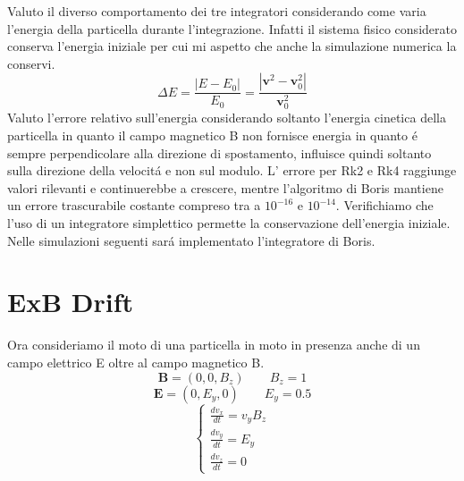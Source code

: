 Valuto il diverso comportamento dei tre integratori considerando come varia l'energia della particella durante l'integrazione. 
Infatti il sistema fisico considerato conserva l'energia iniziale per cui mi aspetto che anche la simulazione numerica la conservi. \\ 
$$\Delta E=\frac{|E-E_0|}{E_0} = \frac{|\mathbf{v}^2 - \mathbf{v}_0^2|}{\mathbf{v}_0^2}$$
Valuto l'errore relativo sull'energia considerando soltanto l'energia cinetica della particella in quanto il campo magnetico B non fornisce energia in quanto é sempre perpendicolare alla direzione di spostamento, influisce quindi soltanto sulla direzione della velocitá e non sul modulo.
L' errore per Rk2 e Rk4 raggiunge valori rilevanti e continuerebbe a crescere, mentre l'algoritmo di Boris mantiene un errore trascurabile costante compreso tra a $10^{-16}$ e $10^{-14}$. Verifichiamo  che l'uso di un integratore simplettico permette la conservazione dell'energia iniziale.
Nelle simulazioni seguenti sará implementato l'integratore di Boris.

\section{ExB Drift}
Ora consideriamo il moto di una particella in moto in presenza anche di un campo elettrico E oltre al campo magnetico B.
$$\mathbf{B}=(0,0,B_z) \qquad B_z=1   $$
$$\mathbf{E}=(0,E_y,0) \qquad E_y=0.5 $$
$$
\begin{cases} 
\frac{dv_x}{dt}=v_y B_z \\ 
\frac{dv_y}{dt}=E_y  \\ 
\frac{dv_z}{dt}=0 
\end{cases}
$$

